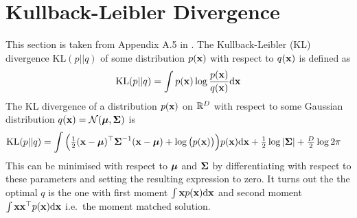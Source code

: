 \section{Kullback-Leibler Divergence} \label{app:KLdiv}
This section is taken from Appendix A.5 in \cite{RaWi06}. The Kullback-Leibler (KL) divergence $\mathrm{KL}(p || q)$ of some distribution $p(\mathbf{x})$ with respect to $q(\mathbf{x})$ is defined as
\begin{equation}
\mathrm{KL}(p || q) = \int p(\mathbf{x}) \log \frac{p(\mathbf{x})}{q(\mathbf{x})} \mathrm{d}\mathbf{x}
\end{equation}
The KL divergence of a distribution $p(\mathbf{x})$ on $\mathbb{R}^D$ with respect to some Gaussian distribution $q(\mathbf{x}) = \mathcal{N}(\boldsymbol{\mu},\boldsymbol{\Sigma})$ is
\begin{align}
\mathrm{KL}(p || q) &= \int \Big( \tfrac{1}{2}(\mathbf{x} - \boldsymbol{\mu})^\top\boldsymbol{\Sigma}^{-1} (\mathbf{x} - \boldsymbol{\mu}) + \log\big(p(\mathbf{x})\big) \Big) p(\mathbf{x}) \mathrm{d}\mathbf{x} 
+ \tfrac{1}{2}\log|\boldsymbol{\Sigma}| + \tfrac{D}{2}\log 2\pi
\end{align}
This can be minimised with respect to $\boldsymbol{\mu}$ and $\boldsymbol{\Sigma}$ by differentiating with respect to these parameters and setting the resulting expression to zero. It turns out the the optimal $q$ is the one with first moment $\int\mathbf{x} p(\mathbf{x})\mathrm{d}\mathbf{x}$ and second moment $\int\mathbf{x}\mathbf{x}^\top p(\mathbf{x})\mathrm{d}\mathbf{x}$ i.e.\ the moment matched solution.




